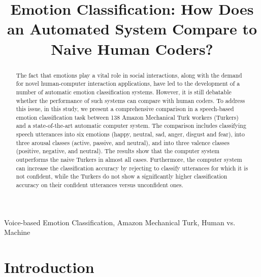 \documentclass{article}
\title{Emotion Classification: How Does an Automated System Compare to Naive Human Coders?}
\begin{document}
\ninept 


\address{$^{\star}$Dept. of Electrical and Computer Engineering, \\
	$^{\dagger}$Dept. of Psychology, University of Rochester, Rochester, NY
	}


\maketitle

\begin{abstract}
	The fact that emotions play a vital role in social interactions, along with the demand for novel human-computer interaction applications, have led to the development of a number of automatic emotion classification systems. However, it is still debatable whether the performance of such systems can compare with human coders. To address this issue, in this study, we present a comprehensive comparison in a speech-based emotion classification task between 138 Amazon Mechanical Turk workers (Turkers) and a state-of-the-art automatic computer system. The comparison includes classifying speech utterances into six emotions (happy, neutral, sad, anger, disgust and fear), into three arousal classes (active, passive, and neutral), and into three valence classes (positive, negative, and neutral). The results show that the computer system outperforms the naive Turkers in almost all cases. Furthermore, the computer system can increase the classification accuracy by rejecting to classify utterances for which it is not confident, while the Turkers do not show a significantly higher classification accuracy on their confident utterances versus unconfident ones. 
		
\end{abstract}

\begin{keywords}
	Voice-based Emotion Classification, Amazon Mechanical Turk, Human vs. Machine
\end{keywords}

	
\section{Introduction} \label{Introduction}
\end{document}
